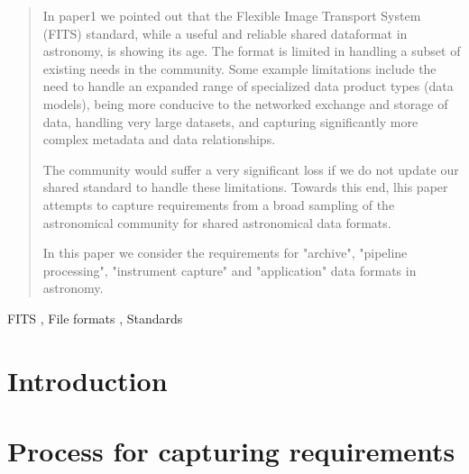 \documentclass[final,authoryear,5p,times,twocolumn]{elsarticle}
\begin{document}
\begin{frontmatter}
\begin{abstract}

In paper1 we pointed out that 
the Flexible Image Transport System (FITS) standard, while a useful and
reliable shared dataformat in astronomy, is showing its age.
The format is limited in handling a subset of existing needs in the community.
Some example limitations include the need to handle an expanded range of 
specialized data product types (data models), being more conducive to the 
networked exchange and storage of data, handling very large datasets, and capturing
significantly more complex metadata and data relationships.

The community would suffer a very significant loss if we do not update our shared
standard to handle these limitations. Towards this end, lhis paper attempts to 
capture requirements from a broad sampling of the astronomical community for 
shared astronomical data formats. 

In this paper we consider the requirements for "archive", "pipeline processing", 
"instrument capture"
and "application" data formats in astronomy.

\end{abstract}

\begin{keyword}%


FITS \sep
File formats \sep
Standards
\end{keyword}

\end{frontmatter}


\newcommand{\aspconf}{ASP Conf.\ Ser}
\newcommand{\aap}{A\&A}
\newcommand{\aaps}{A\&AS}
\newcommand{\jrasc}{JRASC}
\newcommand{\qjras}{QJRAS}
\newcommand{\mnras}{MNRAS}
\newcommand{\pasp}{PASP}
\newcommand{\pasa}{PASA}
\newcommand{\apjs}{ApJS}

\section{Introduction}

\section{Process for capturing requirements}
\end{document}

